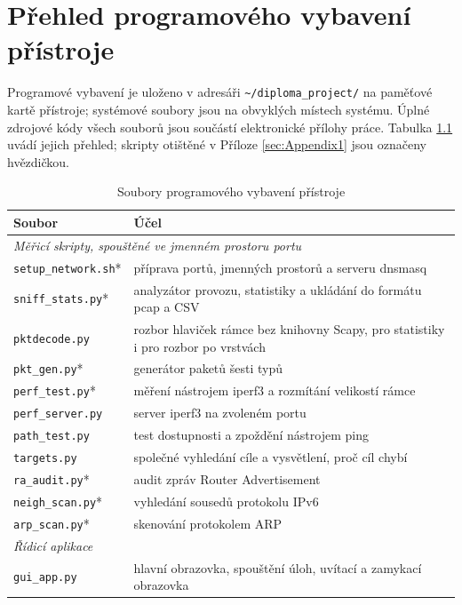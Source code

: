 \chapter{Přehled programového vybavení přístroje}
\label{sec:Appendix2}

Programové vybavení je uloženo v adresáři \texttt{\textasciitilde/diploma\_project/} na paměťové kartě přístroje; systémové soubory jsou na obvyklých místech systému. Úplné zdrojové kódy všech souborů jsou součástí elektronické přílohy práce. Tabulka \ref{tab:soubory} uvádí jejich přehled; skripty otištěné v Příloze \ref{sec:Appendix1} jsou označeny hvězdičkou.

\begin{table}[htbp]
    \caption{Soubory programového vybavení přístroje}
    \label{tab:soubory}
    \centering
    \small
    \begin{tabular}{lp{9.5cm}}
        \hline
        Soubor & Účel \\
        \hline
        \multicolumn{2}{l}{\textit{Měřicí skripty, spouštěné ve jmenném prostoru portu}} \\
        \texttt{setup\_network.sh}* & příprava portů, jmenných prostorů a serveru dnsmasq \\
        \texttt{sniff\_stats.py}* & analyzátor provozu, statistiky a ukládání do formátu pcap a CSV \\
        \texttt{pktdecode.py} & rozbor hlaviček rámce bez knihovny Scapy, pro statistiky i pro rozbor po vrstvách \\
        \texttt{pkt\_gen.py}* & generátor paketů šesti typů \\
        \texttt{perf\_test.py}* & měření nástrojem iperf3 a rozmítání velikostí rámce \\
        \texttt{perf\_server.py} & server iperf3 na zvoleném portu \\
        \texttt{path\_test.py} & test dostupnosti a zpoždění nástrojem ping \\
        \texttt{targets.py} & společné vyhledání cíle a vysvětlení, proč cíl chybí \\
        \texttt{ra\_audit.py}* & audit zpráv Router Advertisement \\
        \texttt{neigh\_scan.py}* & vyhledání sousedů protokolu IPv6 \\
        \texttt{arp\_scan.py}* & skenování protokolem ARP \\
        \multicolumn{2}{l}{\textit{Řídicí aplikace}} \\
        \texttt{gui\_app.py} & hlavní obrazovka, spouštění úloh, uvítací a zamykací obrazovka \\

\end{tabular}
\end{table}
